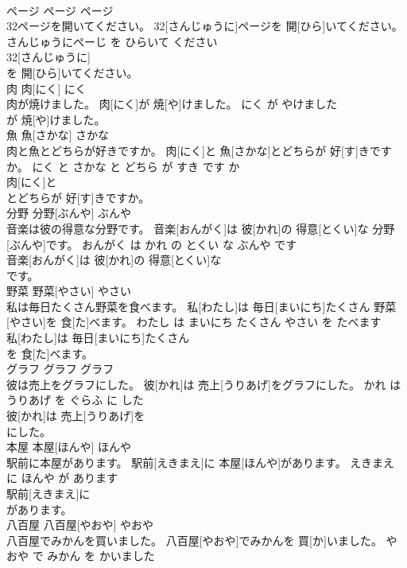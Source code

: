 \documentclass[8pt]{extreport}
\begin{document}
\begin{CJK}{UTF8}{min}
\\	ページ	ページ	ページ	
\\	32ページを開いてください。	32[さんじゅうに]ページを 開[ひら]いてください。	さんじゅうにぺーじ を ひらいて ください	
\\	32[さんじゅうに]
\\	を 開[ひら]いてください。			
\\	肉	肉[にく]	にく	
\\	肉が焼けました。	肉[にく]が 焼[や]けました。	にく が やけました	
\\	が 焼[や]けました。			
\\	魚	魚[さかな]	さかな	
\\	肉と魚とどちらが好きですか。	肉[にく]と 魚[さかな]とどちらが 好[す]きですか。	にく と さかな と どちら が すき です か	
\\	肉[にく]と
\\	とどちらが 好[す]きですか。			
\\	分野	分野[ぶんや]	ぶんや	
\\	音楽は彼の得意な分野です。	音楽[おんがく]は 彼[かれ]の 得意[とくい]な 分野[ぶんや]です。	おんがく は かれ の とくい な ぶんや です	
\\	音楽[おんがく]は 彼[かれ]の 得意[とくい]な
\\	です。			
\\	野菜	野菜[やさい]	やさい	
\\	私は毎日たくさん野菜を食べます。	私[わたし]は 毎日[まいにち]たくさん 野菜[やさい]を 食[た]べます。	わたし は まいにち たくさん やさい を たべます	
\\	私[わたし]は 毎日[まいにち]たくさん
\\	を 食[た]べます。			
\\	グラフ	グラフ	グラフ	
\\	彼は売上をグラフにした。	彼[かれ]は 売上[うりあげ]をグラフにした。	かれ は うりあげ を ぐらふ に した	
\\	彼[かれ]は 売上[うりあげ]を
\\	にした。			
\\	本屋	本屋[ほんや]	ほんや	
\\	駅前に本屋があります。	駅前[えきまえ]に 本屋[ほんや]があります。	えきまえ に ほんや が あります	
\\	駅前[えきまえ]に
\\	があります。			
\\	八百屋	八百屋[やおや]	やおや	
\\	八百屋でみかんを買いました。	八百屋[やおや]でみかんを 買[か]いました。	やおや で みかん を かいました	

\end{CJK}
\end{document}
